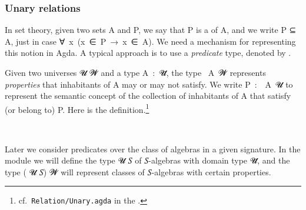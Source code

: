 \subsubsection{Unary relations}

In set theory, given two sets \ab A and \ab P, we say that \ab P is a  of \ab A, and we write \ab P \af ⊆ \ab A, just in case \as ∀~\ab x~(\ab x~\af ∈~\ab P~\as →~\ab x~\af ∈~\ab A). We need a mechanism for representing this notion in Agda. A typical approach is to use a \emph{predicate} type, denoted by .

Given two universes \ab 𝓤 \ab 𝓦 and a type \ab A~\as :~\ab 𝓤\af ̇, the type ~\ab A~\ab 𝓦 represents \emph{properties} that inhabitants of \ab A may or may not satisfy.  We write \ab P~\as :~~\ab A~\ab 𝓤 to represent the semantic concept of the collection of inhabitants of \ab A that satisfy (or belong to) \ab P. Here is the definition.\footnote{\label{relunary}cf.~\texttt{Relation/Unary.agda} in the \agdastdlib.}
\ccpad
\begin{code}%
\>[0]\AgdaSpace{}%
\AgdaSymbol{:}\AgdaSpace{}%
\AgdaSpace{}%
\AgdaSpace{}%
\AgdaSpace{}%
\AgdaSymbol{(}\AgdaSpace{}%
\AgdaSymbol{:}\AgdaSpace{}%
\AgdaSymbol{)}\AgdaSpace{}%
\AgdaSpace{}%
\AgdaSpace{}%
\AgdaSpace{}%
\AgdaSpace{}%
\AgdaSpace{}%
\<%
\\
\>[0]\AgdaSpace{}%
\AgdaSpace{}%
\AgdaSpace{}%
\AgdaSymbol{=}\AgdaSpace{}%
\AgdaSpace{}%
\AgdaSpace{}%
\AgdaSpace{}%
\<%
\end{code}
\ccpad
Later we consider predicates over the class of algebras in a given signature. In the  module we will define the type  \ab 𝓤 \ab 𝑆 of \ab 𝑆-algebras with domain type \ab 𝓤\af ̇, and the type  ( \ab 𝓤 \ab 𝑆) \ab 𝓦 will represent classes of \ab 𝑆-algebras with certain properties.





